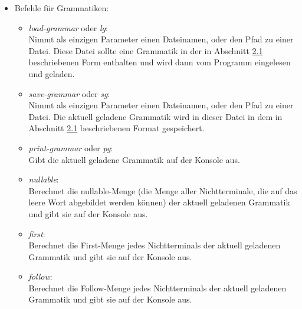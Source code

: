 \begin{itemize}
	\item Befehle für Grammatiken:
	\begin{itemize}
		\item \textit{load-grammar} oder \textit{lg}:\\
		Nimmt als einzigen Parameter einen Dateinamen, oder den Pfad zu einer Datei. Diese Datei sollte eine Grammatik in der in Abschnitt \hyperref[sec:2.1]{2.1} beschriebenen Form enthalten und wird dann vom Programm eingelesen und geladen.
		\item \textit{save-grammar} oder \textit{sg}:\\
		Nimmt als einzigen Parameter einen Dateinamen, oder den Pfad zu einer Datei. Die aktuell geladene Grammatik wird in dieser Datei in dem in Abschnitt \hyperref[sec:2.1]{2.1} beschriebenen Format gespeichert.
		\item \textit{print-grammar} oder \textit{pg}:\\
		Gibt die aktuell geladene Grammatik auf der Konsole aus.
		\item \textit{nullable}:\\
		Berechnet die nullable-Menge (die Menge aller Nichtterminale, die auf das leere Wort abgebildet werden können) der aktuell geladenen Grammatik und gibt sie auf der Konsole aus.
		\item \textit{first}:\\
		Berechnet die First-Menge jedes Nichtterminals der aktuell geladenen Grammatik und gibt sie auf der Konsole aus.
		\item \textit{follow}:\\
		Berechnet die Follow-Menge jedes Nichtterminals der aktuell geladenen Grammatik und gibt sie auf der Konsole aus.
	\end{itemize}
\end{itemize}
